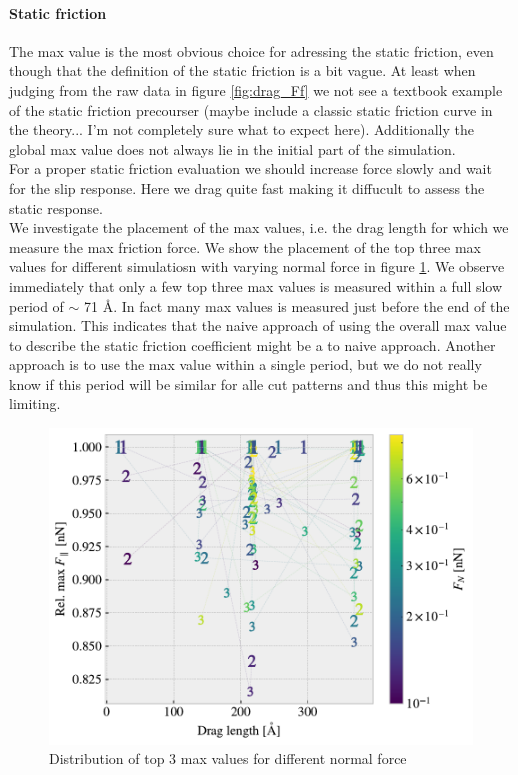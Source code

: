 \paragraph*{Static friction} The max value is the most obvious choice for adressing the static friction, even though that the definition of the static friction is a bit vague. At least when judging from the raw data in figure \ref{fig:drag_Ff} we not see a textbook example of the static friction precourser  (maybe include a classic static friction curve in the theory... I'm not completely sure what to expect here). Additionally the global max value does not always lie in the initial part of the simulation. \\
For a proper static friction evaluation we should increase force slowly and wait for the slip response. Here we drag quite fast making it diffucult to assess the static response. \\
We investigate the placement of the max values, i.e. the drag length for which we measure the max friction force. We show the placement of the top three max values for different simulatiosn with varying normal force in figure \ref{fig:max_dist}. We observe immediately that only a few top three max values is measured within a full slow period of $\sim$ 71 Å. In fact many max values is measured just before the end of the simulation. This indicates that the naive approach of using the overall max value to describe the static friction coefficient might be a to naive approach. Another approach is to use the max value within a single period, but we do not really know if this period will be similar for alle cut patterns and thus this might be limiting. 

\begin{figure}[H]
  \centering
  \includegraphics[width=0.6\linewidth]{figures/baseline/max_dist.pdf}
  \caption{Distribution of top 3 max values for different normal force}
  \label{fig:max_dist}
\end{figure}


